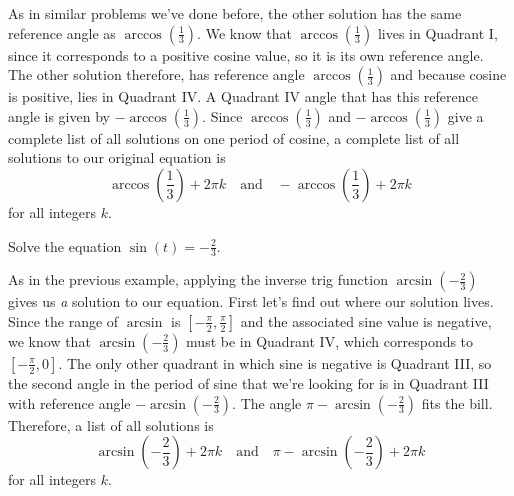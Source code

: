 \documentclass{ximera}
\begin{document}
\begin{example}
\begin{explanation}
As in similar problems we've done before, the other solution has the same reference angle as $\arccos\left(\frac{1}{3}\right)$. We know that $\arccos\left(\frac{1}{3}\right)$ lives in Quadrant I, since it corresponds to a positive cosine value, so it is its own reference angle. The other solution therefore, has reference angle $\arccos\left(\frac{1}{3}\right)$ and because cosine is positive, lies in Quadrant IV. A Quadrant IV angle that has this reference angle is given by $-\arccos\left(\frac{1}{3}\right)$. Since $\arccos\left(\frac{1}{3}\right)$ and $-\arccos\left(\frac{1}{3}\right)$ give a complete list of all solutions on one period of cosine, a complete list of all solutions to our original equation is 
$$\arccos\left(\frac{1}{3}\right) + 2\pi k \quad \text{and} \quad-\arccos\left(\frac{1}{3}\right) + 2\pi k$$
 for all integers $k$.
\end{explanation}
\end{example}

\begin{example}
Solve the equation $\sin(t) = -\frac{2}{3}$. 
\begin{explanation}
As in the previous example, applying the inverse trig function $\arcsin\left(-\frac{2}{3}\right)$ gives us \emph{a} solution to our equation. First let's find out where our solution lives. Since the range of $\arcsin$ is $\left[-\frac{\pi}{2}, \frac{\pi}{2}\right]$ and the associated sine value is negative, we know that $\arcsin\left(-\frac{2}{3}\right)$ must be in Quadrant IV, which corresponds to $\left[-\frac{\pi}{2}, 0\right]$. The only other quadrant in which sine is negative is Quadrant III, so the second angle in the period of sine that we're looking for is in Quadrant III with reference angle $-\arcsin\left(-\frac{2}{3}\right)$. The angle $\pi - \arcsin\left(-\frac{2}{3}\right)$ fits the bill. Therefore, a list of all solutions is 
$$\arcsin\left(-\frac{2}{3}\right) + 2\pi k\quad \text{and} \quad \pi - \arcsin\left(-\frac{2}{3}\right) + 2\pi k$$
for all integers $k$. 
\end{explanation}
\end{example}
\end{document}
